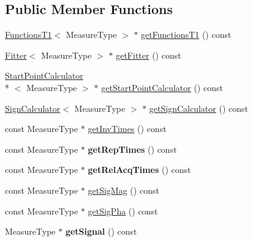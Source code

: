 \subsection*{Public Member Functions}
\begin{DoxyCompactItemize}
\item 
\hyperlink{class_ox_1_1_functions_t1}{Functions\-T1}$<$ Measure\-Type $>$ $\ast$ \hyperlink{class_ox_1_1_calculator_t1_a34cee88c8f78b6486ebbfc910559717b}{get\-Functions\-T1} () const 
\item 
\hyperlink{class_ox_1_1_fitter}{Fitter}$<$ Measure\-Type $>$ $\ast$ \hyperlink{class_ox_1_1_calculator_t1_a57f0218fb065b685f4ed5f80051517bd}{get\-Fitter} () const 
\item 
\hyperlink{class_ox_1_1_start_point_calculator}{Start\-Point\-Calculator}\\*
$<$ Measure\-Type $>$ $\ast$ \hyperlink{class_ox_1_1_calculator_t1_a2ee52aac70f34defc99373d5f9f1ed8a}{get\-Start\-Point\-Calculator} () const 
\item 
\hyperlink{class_ox_1_1_sign_calculator}{Sign\-Calculator}$<$ Measure\-Type $>$ $\ast$ \hyperlink{class_ox_1_1_calculator_t1_affc80bde70a6f44f2474e9e0606ba3e0}{get\-Sign\-Calculator} () const 
\item 
const Measure\-Type $\ast$ \hyperlink{class_ox_1_1_calculator_t1_a7179ab384f0ff7f9bf28dc492672da00}{get\-Inv\-Times} () const 
\item 
\hypertarget{class_ox_1_1_calculator_t1_aaa68c32a3bba3f994cf00f5c41551952}{const Measure\-Type $\ast$ {\bfseries get\-Rep\-Times} () const }\label{class_ox_1_1_calculator_t1_aaa68c32a3bba3f994cf00f5c41551952}

\item 
\hypertarget{class_ox_1_1_calculator_t1_ac75dbb9b03f6350c19c1551c2bd4bf47}{const Measure\-Type $\ast$ {\bfseries get\-Rel\-Acq\-Times} () const }\label{class_ox_1_1_calculator_t1_ac75dbb9b03f6350c19c1551c2bd4bf47}

\item 
const Measure\-Type $\ast$ \hyperlink{class_ox_1_1_calculator_t1_a7a8fbda407b35212f781640e7cee9f2c}{get\-Sig\-Mag} () const 
\item 
const Measure\-Type $\ast$ \hyperlink{class_ox_1_1_calculator_t1_a1208138a5257482a5f3acc308f3bfd5a}{get\-Sig\-Pha} () const 
\item 
\hypertarget{class_ox_1_1_calculator_t1_a7048aabe616f4ab4b0746d07b38acfa5}{Measure\-Type $\ast$ {\bfseries get\-Signal} () const }\label{class_ox_1_1_calculator_t1_a7048aabe616f4ab4b0746d07b38acfa5}


\end{DoxyCompactItemize}
